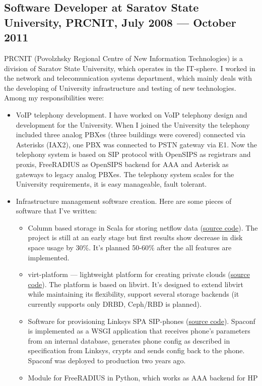 \documentclass[a4paper,10pt]{article}
\begin{document}
\subsection{Software Developer at Saratov State University, PRCNIT, July 2008 ---
October 2011}
PRCNIT (Povolzhsky Regional Centre of New Information Technologies) is a division
of Saratov State University, which operates in the IT-sphere. I worked in the
network and telecomunication systems department, which mainly deals with
the developing of University infrastructure and testing of new technologies. Among
my responsibilities were:
\begin{itemize}
\item VoIP telephony development. I have worked on VoIP telephony design and
development for the University. When I joined the University the telephony included
three analog PBXes (three buildings were covered) connected via Asterisks (IAX2),
one PBX was connected to PSTN gateway via E1. Now the telephony system is based on
SIP protocol with OpenSIPS as registrars and proxis, FreeRADIUS as OpenSIPS
backend for AAA and Asterisk as gateways to legacy analog PBXes. The telephony
system scales for the University requirements, it is easy manageable, fault tolerant.
\item Infrastructure management software creation. Here are some pieces of
software that I've written:
 \begin{itemize}
 \item Column based storage in Scala for storing netflow data
(\href{http://github.com/ivaxer/cbs}{source code}). The project is still at an
early stage but first results show decrease in disk space usage by 30\%. It's
planned 50-60\% after the all features are implemented.
 \item virt-platform --- lightweight platform for creating private clouds
(\href{http://git.sgu.ru/?p=virt-platform.git;a=summary}{source code}).
The platform is based on libvirt. It's designed to extend libvirt
while maintaining its flexibility, support several storage backends (it currently
supports only DRBD, Ceph\slash RBD is planned).
 \item Software for provisioning Linksys SPA SIP-phones
(\href{http://git.sgu.ru/?p=spaconf.git;a=summary}{source code}). Spaconf is
implemented as a WSGI application that receives phone's
parameters from an internal database, generates phone config as described in
specification from Linksys, crypts and sends config back to the phone.  Spaconf
was deployed to production two years ago.
 \item Module for FreeRADIUS in Python, which works as AAA backend for HP

\end{itemize}
\end{itemize}
\end{document}
